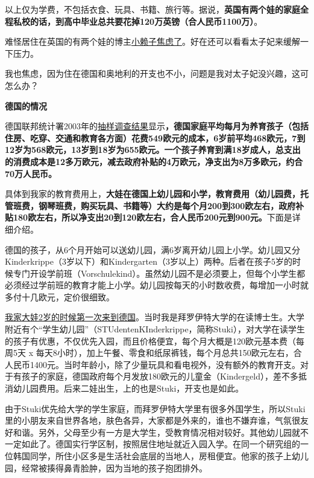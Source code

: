 \documentclass[twoside,openright,headings=optiontohead]{ctexbook} %
\begin{document}
{以上仅为学费，不包括衣食、玩具、书籍、旅行等。据说，\textbf{英国有两个娃的家庭全程私校的话，到高中毕业总共要花掉120万英镑（合人民币1100万）}。

难怪居住在英国的有两个娃的博主\href{https://justyy.com/archives/2552}{小赖子焦虑了}。好在还可以看看太子妃来缓解一下压力。

我也焦虑，因为住在德国和奥地利的开支也不小，问题是我对太子妃没兴趣，这可怎么办？

\textbf{德国的情况}

德国联邦统计署2003年的\href{http://www.dw.com/zh/\%E5\%9C\%A8\%E5\%BE\%B7\%E5\%9B\%BD\%E5\%85\%BB\%E4\%B8\%80\%E4\%B8\%AA\%E5\%AD\%A9\%E5\%AD\%90\%E9\%9C\%80\%E8\%A6\%81\%E5\%A4\%9A\%E5\%B0\%91\%E9\%92\%B1/a-17234196}{抽样调查结果}显示\textbf{，德国家庭平均每月为养育孩子（包括住房、吃穿、交通和教育各方面）花费549欧元的成本，6岁前平均468欧元，7到12岁为568欧元，13岁到18岁为655欧元。一个孩子养育到满18岁成人，总支出的消费成本是12多万欧元，减去政府补贴的4万欧元，净支出为8万多欧元，约合70万人民币。}

具体到我家的教育费用上，\textbf{大娃在德国上幼儿园和小学，教育费用（幼儿园费，托管班费，钢琴班费，购买玩具、书籍等）大约是每个月200到300欧左右，政府补贴180欧左右，所以净支出20到120欧左右，合人民币200元到900元。}下面是详细介绍。

德国的孩子，从6个月开始可以送幼儿园，满6岁离开幼儿园上小学。幼儿园又分Kinderkrippe（3岁以下）和Kindergarten（3岁以上）两种。后者在孩子5岁的时候专门开设学前班（Vorschulekind）。虽然幼儿园不是必须要上，但每个小学生都必须经过学前班的教育才能上小学。幼儿园按每天的小时数收费，每增加一小时就多付十几欧元，定价很细致。

\href{http://dapengde.com/archives/12229}{我家大娃2岁的时候第一次来到德国}。当时我是拜罗伊特大学的在读博士生。大学附近有个``学生幼儿园''（STUdentenKInderkrippe，简称Stuki），对大学在读学生的孩子有优惠，不仅优先入园，而且价格便宜，每个月大概是120欧元基本费（每周5天
x
每天8小时），加上午餐、零食和纸尿裤钱，每个月总共150欧元左右，合人民币1400元。当时年龄小，除了少量玩具和看电视外，没有额外的教育开支。对于有孩子的家庭，德国政府每个月发放180欧元的儿童金（Kindergeld），差不多抵消幼儿园费用。后来二娃出生，上的也是Stuki，开支也是如此。

由于Stuki优先给大学的学生家庭，而拜罗伊特大学里有很多外国学生，所以Stuki里的小朋友来自世界各地，肤色各异，大家都是外来的，谁也不嫌弃谁，气氛很友好和谐。另外，父母至少有一方是大学生，受教育情况相对较好。其他幼儿园就不一定如此了。德国实行学区制，按照居住地址就近入园入学。在同一个研究组的一位韩国同学，所住小区多是生活社会底层的当地人，房租便宜。他家的孩子上幼儿园，经常被揍得鼻青脸肿，因为当地的孩子抱团排外。

}
\end{document}
